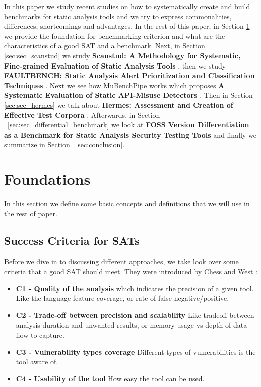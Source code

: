 \documentclass[authoryear,preprint]{sigplanconf}
\begin{document}
In this paper we study recent studies on how to systematically create and build benchmarks for static analysis tools and we try to express commonalities, differences, shortcomings and advantages. In the rest of this paper, in Section \ref{sec:sec_approaches} we provide the foundation for benchmarking criterion and what are the characteristics of a good SAT and a benchmark. Next, in Section \ref{sec:sec_scanstud} we study \textbf{Scanstud: A Methodology for Systematic, Fine-grained Evaluation of Static Analysis Tools} \cite{Scanstud}, then we study \textbf{FAULTBENCH: Static
	Analysis Alert Prioritization and Classification Techniques} \cite{Heckman:2008:EBE:1414004.1414013}. Next we see how MuBenchPipe works which proposes \textbf{A Systematic Evaluation of Static API-Misuse Detectors} \cite{8338426}. Then in Section \ref{sec:sec_hermes} we talk about \textbf{Hermes: Assessment and Creation of Effective Test Corpora} \cite{Reif:2017:HAC:3088515.3088523}. Afterwards, in Section ~\ref{sec:sec_differential_benchmark} we look at \textbf{FOSS Version Differentiation as a Benchmark for Static Analysis Security Testing Tools} \cite{Pashchenko:2017:FVD:3106237.3121276} and finally we summarize in Section ~\ref{sec:conclusion}. 

\section{Foundations}
\label{sec:sec_approaches}

In this section we define some basic concepts and definitions that we will use in the rest of paper. 

\subsection{Success Criteria for SATs}
\label{sec:subsec_successc}

Before we dive in to discussing different approaches, we take look over some criteria that a good SAT should meet. They were introduced by Chess and West \cite{Chess:2007:SPS:1406221}:

\begin{itemize}
	\item \textbf{C1 - Quality of the analysis} which indicates the precision of a given tool. Like the language feature coverage, or rate of false negative/positive.
	\item \textbf{C2 - Trade-off between precision and scalability} Like tradeoff between analysis duration and unwanted results, or memory usage vs depth of data flow to capture. 
	\item \textbf{C3 - Vulnerability types coverage} Different types of vulnerabilities is the tool aware of. 
	\item \textbf{C4 - Usability of the tool} How easy the tool can be used.
\end{itemize}
\end{document}
